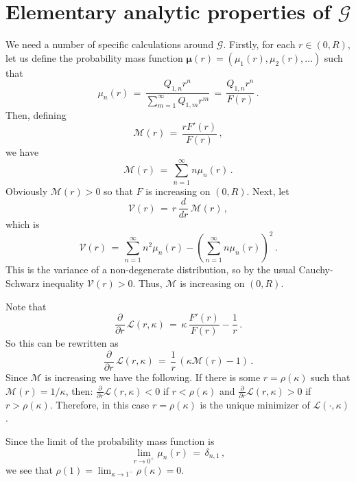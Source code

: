\documentclass[12pt]{article}
\begin{document}
\section{Elementary analytic properties of $\mathcal{G}$}

We need a number of specific calculations around $\mathcal{G}$.
Firstly, for each $r \in (0,R)$, let us define the probability mass function
$\boldsymbol{\mu}(r) = (\mu_1(r),\mu_2(r),\dots)$ such that
$$
\mu_n(r)\, =\, \frac{Q_{1,n} r^n}{\sum_{m=1}^{\infty} Q_{1,m} r^m}\, =\, \frac{Q_{1,n} r^n}{F(r)}\, .
$$
Then, defining
$$
\mathcal{M}(r)\, =\, \frac{r F'(r)}{F(r)}\, ,
$$
we have
$$
\mathcal{M}(r)\, =\, \sum_{n=1}^{\infty} n \mu_n(r)\, .
$$
Obviously $\mathcal{M}(r)>0$ so that $F$ is increasing on $(0,R)$.
Next, let 
$$
\mathcal{V}(r)\, =\, r\, \frac{d}{dr}\, \mathcal{M}(r)\, ,
$$
which is 
$$
\mathcal{V}(r)\, =\, \sum_{n=1}^{\infty} n^2 \mu_n(r) - \left(\sum_{n=1}^{\infty} n \mu_n(r)\right)^2\, .
$$
This is the variance of a non-degenerate distribution, so by the usual Cauchy-Schwarz inequality
$\mathcal{V}(r)>0$.
Thus, $\mathcal{M}$ is increasing on $(0,R)$.

Note that
$$
\frac{\partial}{\partial r}\, \mathcal{L}(r,\kappa)\, =\, \kappa\, \frac{F'(r)}{F(r)} - \frac{1}{r}\, .
$$
So this can be rewritten as 
$$
\frac{\partial}{\partial r}\, \mathcal{L}(r,\kappa)\, =\, \frac{1}{r}\, \left(\kappa \mathcal{M}(r) - 1\right)\, .
$$
Since $\mathcal{M}$ is increasing we have the following. If there is some $r=\rho(\kappa)$ 
such that $\mathcal{M}(r) = 1/\kappa$, then: $\frac{\partial}{\partial r} \mathcal{L}(r,\kappa)<0$ if $r<\rho(\kappa)$
and $\frac{\partial}{\partial r} \mathcal{L}(r,\kappa)>0$ if $r>\rho(\kappa)$.
Therefore, in this case $r=\rho(\kappa)$ is the unique minimizer of $\mathcal{L}(\cdot,\kappa)$.

Since the limit of the probability mass function is 
$$
\lim_{r \to 0^+} \mu_n(r)\, =\, \delta_{n,1}\, ,
$$
we see that $\rho(1) = \lim_{\kappa \to 1^-} \rho(\kappa)=0$.
\end{document}
